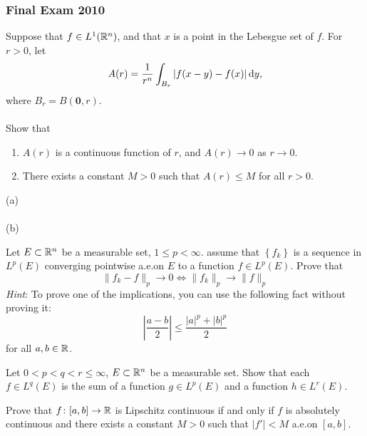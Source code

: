 \subsubsection{Final Exam 2010}
\setcounter{exercise}{0}
\setcounter{equation}{0}

\begin{problem}
Suppose that $f\in L^1(\mathbb{R}^n)$, and that $ x $ is a point in the Lebesgue
set of $f$. For $r>0$, let
\[
A(r)= \frac{1}{r^n}\int_{B_r}|f( x - y )-f( x )|\mathop{}\!\mathrm{d} y ,
\]
where $B_r= B(\mathbf{0},r)$.
\\\\
Show that
\begin{enumerate}[label=(\alph*),noitemsep]
\item $A(r)$ is a continuous function of $r$, and $A(r)\to 0$ as $r\to 0$.
\item There exists a constant $M>0$ such that $A(r)\leq M$ for all $r>0$.
\end{enumerate}
\end{problem}
\begin{solution}
(a)
\\\\
(b)
\end{solution}

\begin{problem}
Let $E\subset\mathbb{R}^n$ be a measurable set, $1\leq p<\infty$. assume that
$\left\{ f_k \right\}$ is a sequence in $L^p(E)$ converging pointwise
a.e.\@ on $E$ to a function $f\in L^p(E)$. Prove that
\[
\|f_k-f\|_p\longrightarrow 0\iff
\|f_k\|_p\longrightarrow\|f\|_p
\]
\emph{Hint}: To prove one of the implications, you can use the following
fact without proving it:
\[
\left|
\frac{a-b}{2}
\right|
\leq
\frac{|a|^p+|b|^p}{2}
\]
for all $a,b\in\mathbb{R}$.
\end{problem}
\begin{solution}
\end{solution}

\begin{problem}
Let $0<p<q<r\leq\infty$, $E\subset\mathbb{R}^n$ be a measurable set. Show that
each $f\in L^q(E)$ is the sum of a function $g\in L^p(E)$ and a function
$h\in L^r(E)$.
\end{problem}
\begin{solution}
\end{solution}

\begin{problem}
Prove that $f\colon[a,b]\to\mathbb{R}$ is Lipschitz continuous if and only if $f$
is absolutely continuous and there exists a constant $M>0$ such that
$|f'|<M$ a.e.\@ on $[a,b]$.
\end{problem}
\begin{solution}
\end{solution}

